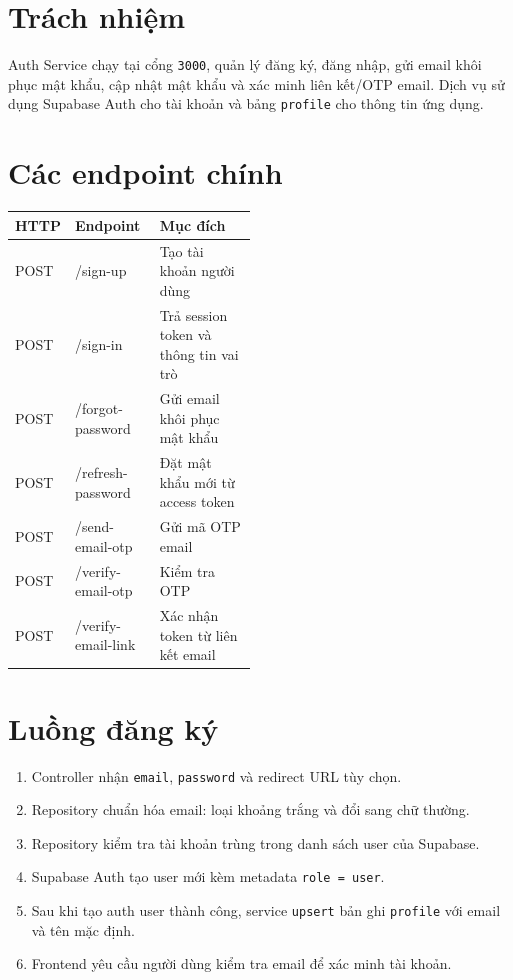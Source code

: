 \documentclass[12pt]{article}
\begin{document}

\section{Trách nhiệm}
Auth Service chạy tại cổng \texttt{3000}, quản lý đăng ký, đăng nhập, gửi email khôi phục mật khẩu, cập nhật mật khẩu và xác minh liên kết/OTP email. Dịch vụ sử dụng Supabase Auth cho tài khoản và bảng \texttt{profile} cho thông tin ứng dụng.

\section{Các endpoint chính}
\begin{tabularx}{\linewidth}{p{0.13\linewidth} >{\ttfamily}p{0.35\linewidth} X}
\toprule
HTTP & Endpoint & Mục đích \\
\midrule
POST & /sign-up & Tạo tài khoản người dùng \\
POST & /sign-in & Trả session token và thông tin vai trò \\
POST & /forgot-password & Gửi email khôi phục mật khẩu \\
POST & /refresh-password & Đặt mật khẩu mới từ access token \\
POST & /send-email-otp & Gửi mã OTP email \\
POST & /verify-email-otp & Kiểm tra OTP \\
POST & /verify-email-link & Xác nhận token từ liên kết email \\
\bottomrule
\end{tabularx}

\section{Luồng đăng ký}
\begin{enumerate}
  \item Controller nhận \texttt{email}, \texttt{password} và redirect URL tùy chọn.
  \item Repository chuẩn hóa email: loại khoảng trắng và đổi sang chữ thường.
  \item Repository kiểm tra tài khoản trùng trong danh sách user của Supabase.
  \item Supabase Auth tạo user mới kèm metadata \texttt{role = user}.
  \item Sau khi tạo auth user thành công, service \texttt{upsert} bản ghi \texttt{profile} với email và tên mặc định.
  \item Frontend yêu cầu người dùng kiểm tra email để xác minh tài khoản.
\end{enumerate}
\end{document}
